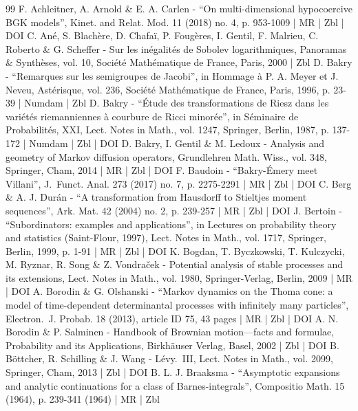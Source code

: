 \documentclass[10pt]{amsart}
\theoremstyle{plain}
\theoremstyle{definition}
\begin{document}
\begin{thebibliography}{99}
F. Achleitner, A. Arnold \& E. A. Carlen - “On multi-dimensional hypocoercive BGK models”, Kinet. and Relat. Mod. 11 (2018) no. 4, p. 953-1009 | MR | Zbl | DOI
C. Ané, S. Blachère, D. Chafaï, P. Fougères, I. Gentil, F. Malrieu, C. Roberto \& G. Scheffer - Sur les inégalités de Sobolev logarithmiques, Panoramas \& Synthèses, vol. 10, Société Mathématique de France, Paris, 2000 | Zbl
D. Bakry - “Remarques sur les semigroupes de Jacobi”, in Hommage à P. A. Meyer et J. Neveu, Astérisque, vol. 236, Société Mathématique de France, Paris, 1996, p. 23-39 | Numdam | Zbl
D. Bakry - “Étude des transformations de Riesz dans les variétés riemanniennes à courbure de Ricci minorée”, in Séminaire de Probabilités, XXI, Lect. Notes in Math., vol. 1247, Springer, Berlin, 1987, p. 137-172 | Numdam | Zbl | DOI
D. Bakry, I. Gentil \& M. Ledoux - Analysis and geometry of Markov diffusion operators, Grundlehren Math. Wiss., vol. 348, Springer, Cham, 2014 | MR | Zbl | DOI
F. Baudoin - “Bakry-Émery meet Villani”, J. Funct. Anal. 273 (2017) no. 7, p. 2275-2291 | MR | Zbl | DOI
C. Berg \& A. J. Durán - “A transformation from Hausdorff to Stieltjes moment sequences”, Ark. Mat. 42 (2004) no. 2, p. 239-257 | MR | Zbl | DOI
J. Bertoin - “Subordinators: examples and applications”, in Lectures on probability theory and statistics (Saint-Flour, 1997), Lect. Notes in Math., vol. 1717, Springer, Berlin, 1999, p. 1-91 | MR | Zbl | DOI
K. Bogdan, T. Byczkowski, T. Kulczycki, M. Ryznar, R. Song \& Z. Vondraček - Potential analysis of stable processes and its extensions, Lect. Notes in Math., vol. 1980, Springer-Verlag, Berlin, 2009 | MR | DOI
A. Borodin \& G. Olshanski - “Markov dynamics on the Thoma cone: a model of time-dependent determinantal processes with infinitely many particles”, Electron. J. Probab. 18 (2013), article ID 75, 43 pages | MR | Zbl | DOI
A. N. Borodin \& P. Salminen - Handbook of Brownian motion—facts and formulae, Probability and its Applications, Birkhäuser Verlag, Basel, 2002 | Zbl | DOI
B. Böttcher, R. Schilling \& J. Wang - Lévy. III, Lect. Notes in Math., vol. 2099, Springer, Cham, 2013 | Zbl | DOI
B. L. J. Braaksma - “Asymptotic expansions and analytic continuations for a class of Barnes-integrals”, Compositio Math. 15 (1964), p. 239-341 (1964) | MR | Zbl

\end{thebibliography}
\end{document}
